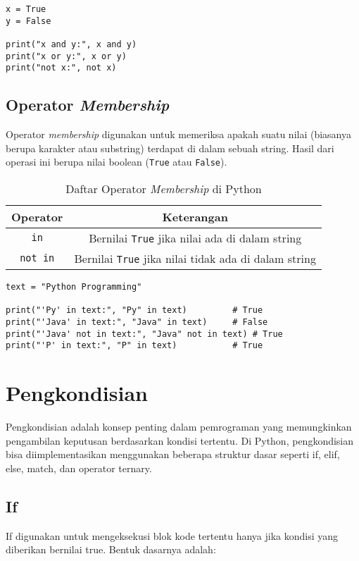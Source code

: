 \begin{lstlisting}[style=PythonStyle, caption={Kode Python: logical_operator.py}]
x = True
y = False

print("x and y:", x and y)
print("x or y:", x or y)
print("not x:", not x)
\end{lstlisting}

\subsection{Operator \textit{Membership}}
Operator \textit{membership} digunakan untuk memeriksa apakah suatu nilai (biasanya berupa karakter atau substring) 
terdapat di dalam sebuah string. Hasil dari operasi ini berupa nilai boolean (\texttt{True} atau \texttt{False}).

\begin{table}[H]
\centering
\begin{tabular}{|c|c|}
\hline
\textbf{Operator} & \textbf{Keterangan} \\
\hline
\texttt{in} & Bernilai \texttt{True} jika nilai ada di dalam string \\
\hline
\texttt{not in} & Bernilai \texttt{True} jika nilai tidak ada di dalam string \\
\hline
\end{tabular}
\caption{Daftar Operator \textit{Membership} di Python}
\end{table}

\begin{lstlisting}[style=PythonStyle, caption={Kode Python: membership_operator.py}]
text = "Python Programming"

print("'Py' in text:", "Py" in text)         # True
print("'Java' in text:", "Java" in text)     # False
print("'Java' not in text:", "Java" not in text) # True
print("'P' in text:", "P" in text)           # True
\end{lstlisting}

\section{Pengkondisian}
Pengkondisian adalah konsep penting dalam pemrograman yang memungkinkan pengambilan keputusan berdasarkan kondisi tertentu. Di Python, pengkondisian bisa diimplementasikan menggunakan beberapa struktur dasar seperti if, elif, else, match, dan operator ternary.

\subsection{If}
If digunakan untuk mengeksekusi blok kode tertentu hanya jika kondisi yang diberikan bernilai true. Bentuk dasarnya adalah:


